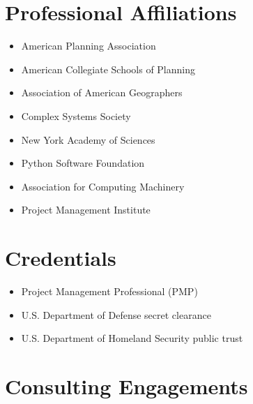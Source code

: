 \documentclass{academiccv}
\begin{document}
\section*{Professional Affiliations}

\begin{itemize}
	
\item American Planning Association

\item American Collegiate Schools of Planning

\item Association of American Geographers

\item Complex Systems Society

\item New York Academy of Sciences

\item Python Software Foundation

\item Association for Computing Machinery

\item Project Management Institute

\end{itemize}



\section*{Credentials}

\begin{itemize}
	
\item Project Management Professional (PMP)

\item U.S. Department of Defense secret clearance

\item U.S. Department of Homeland Security public trust

\end{itemize}



\section*{Consulting Engagements}
\end{document}
